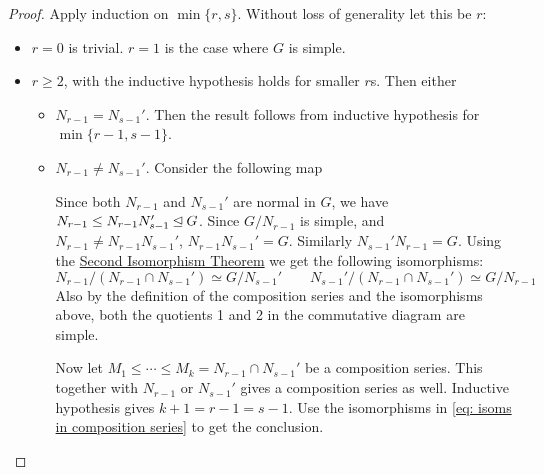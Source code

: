 \begin{proof}
    Apply induction on $\min\{r, s\}$. Without loss of generality let this be $r$:
    \begin{itemize}
        \item $r = 0$ is trivial. $r = 1$ is the case where $G$ is simple.
        \item $r \geq 2$, with the inductive hypothesis holds for smaller $r$s. Then either
        \begin{itemize}
            \item $N_{r-1} = N_{s-1}'$. Then the result follows from inductive hypothesis for $\min\{r-1, s-1\}$.
            \item $N_{r-1} \neq N_{s-1}'$. Consider the following map
            
            \begin{minipage}{\linewidth}
                \centering
            \end{minipage}
            Since both $N_{r-1}$ and $N_{s-1}'$ are normal in $G$, we have $N_{r-1} \leq N_{r-1} N_{s-1}' \unlhd G$. Since $G/N_{r-1}$ is simple, and $N_{r-1} \neq N_{r-1} N_{s-1}'$, $N_{r-1} N_{s-1}' = G$. Similarly $N_{s-1}' N_{r-1} = G$. Using the \hyperref[thm: second isomorphism theorem]{Second Isomorphism Theorem} we get the following isomorphisms:
            \begin{equation}\tag{$\ast$}\label{eq: isoms in composition series}
                N_{r-1}/(N_{r-1} \cap N_{s-1}') \simeq G/N_{s-1}' \qquad N_{s-1}'/(N_{r-1} \cap N_{s-1}') \simeq G/N_{r-1}
            \end{equation}
            Also by the definition of the composition series and the isomorphisms above, both the quotients 1 and 2 in the commutative diagram are simple.

            Now let $M_1 \leq \cdots \leq M_k= N_{r-1} \cap N_{s-1}'$ be a composition series. This together with $N_{r-1}$ or $N_{s-1}'$ gives a composition series as well. Inductive hypothesis gives $k+1 = r-1 = s-1$. Use the isomorphisms in \eqref{eq: isoms in composition series} to get the conclusion.
        \end{itemize}
    \end{itemize}
\end{proof}

